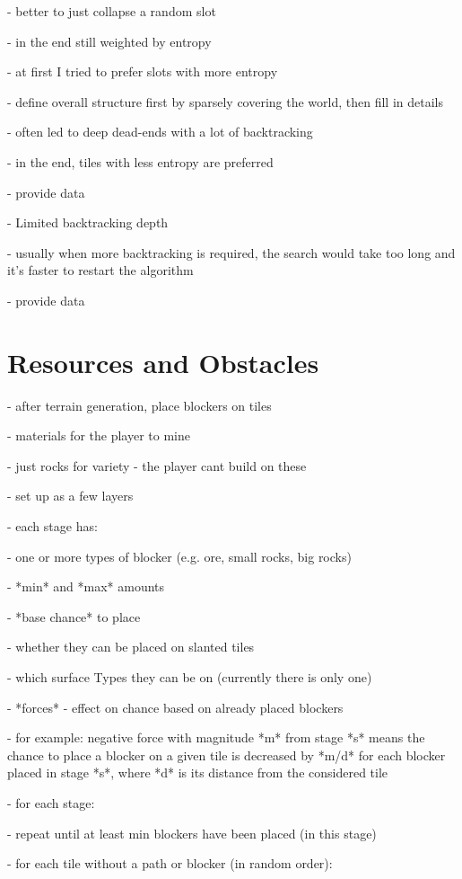 - better to just collapse a random slot

- in the end still weighted by entropy

- at first I tried to prefer slots with more entropy

- define overall structure first by sparsely covering the world, then fill in details

- often led to deep dead-ends with a lot of backtracking

- in the end, tiles with less entropy are preferred

- provide data

- Limited backtracking depth

- usually when more backtracking is required, the search would take too long and it's faster to restart the algorithm

- provide data

\section{Resources and Obstacles}

- after terrain generation, place blockers on tiles

- materials for the player to mine

- just rocks for variety - the player cant build on these

- set up as a few layers

- each stage has:

- one or more types of blocker (e.g. ore, small rocks, big rocks)

- *min* and *max* amounts

- *base chance* to place

- whether they can be placed on slanted tiles

- which surface Types they can be on (currently there is only one)

- *forces* - effect on chance based on already placed blockers

- for example: negative force with magnitude *m* from stage *s* means the chance to place a blocker on a given tile is decreased by *m/d*  for each blocker placed in stage *s*, where *d* is its distance from the considered tile

- for each stage:

- repeat until at least min blockers have been placed (in this stage)

- for each tile without a path or blocker (in random order):

